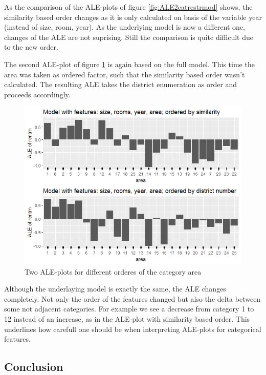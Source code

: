 \documentclass[
]{krantz}
\begin{document}
As the comparison of the ALE-plots of figure \ref{fig:ALE2catrestrmod} shows, the similarity based order changes as it is only calculated on basis of the variable year (instead of size, room, year). As the underlying model is now a different one, changes of the ALE are not suprising. Still the comparison is quite difficult due to the new order.

The second ALE-plot of figure \ref{fig:ALE2catdifford} is again based on the full model. This time the area was taken as ordered factor, such that the similarity based order wasn't calculated. The resulting ALE takes the district enumeration as order and proceeds accordingly.

\begin{figure}
\includegraphics[width=1\linewidth]{images/ALE_2_cat_different_orders_} \caption{Two ALE-plots for different orderes of the category area}\label{fig:ALE2catdifford}
\end{figure}



Although the underlaying model is exactly the same, the ALE changes completely. Not only the order of the features changed but also the delta between some not adjacent categories. For example we see a decrease from category 1 to 12 instead of an increase, as in the ALE-plot with similarity based order. This underlines how carefull one should be when interpreting ALE-plots for categorical features.

\hypertarget{conclusion-1}{%
\subsection{Conclusion}\label{conclusion-1}}
\end{document}
